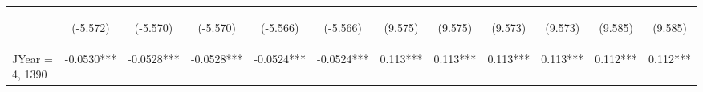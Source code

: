 \documentclass[]{article}
\begin{document}
\begin{center}
\begin{tabular}{lccccccccccc}
        \vspace{4pt}     & \begin{footnotesize}(-5.572)\end{footnotesize} & \begin{footnotesize}(-5.570)\end{footnotesize} & \begin{footnotesize}(-5.570)\end{footnotesize} & \begin{footnotesize}(-5.566)\end{footnotesize} & \begin{footnotesize}(-5.566)\end{footnotesize} & \begin{footnotesize}(9.575)\end{footnotesize}   & \begin{footnotesize}(9.575)\end{footnotesize}   & \begin{footnotesize}(9.573)\end{footnotesize}  & \begin{footnotesize}(9.573)\end{footnotesize}  & \begin{footnotesize}(9.585)\end{footnotesize}  & \begin{footnotesize}(9.585)\end{footnotesize}  \\
        JYear = 4, 1390  & -0.0530***                                     & -0.0528***                                     & -0.0528***                                     & -0.0524***                                     & -0.0524***                                     & 0.113***                                        & 0.113***                                        & 0.113***                                       & 0.113***                                       & 0.112***                                       & 0.112***                                       \\

\end{tabular}
\end{center}
\end{document}
